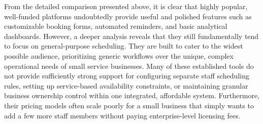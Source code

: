 \begin{table}[h]
\centering
\caption{Feature Comparison: Slotify vs. Existing Platforms} \label{tab:litreview}
\renewcommand{\arraystretch}{1.15}
\end{table}

From the detailed comparison presented above, it is clear that highly popular, well-funded platforms undoubtedly provide useful and polished features such as customizable booking forms, automated reminders, and basic analytical dashboards. However, a deeper analysis reveals that they still fundamentally tend to focus on general-purpose scheduling. They are built to cater to the widest possible audience, prioritizing generic workflows over the unique, complex operational needs of small service businesses. Many of these established tools do not provide sufficiently strong support for configuring separate staff scheduling rules, setting up service-based availability constraints, or maintaining granular business ownership control within one integrated, affordable system. Furthermore, their pricing models often scale poorly for a small business that simply wants to add a few more staff members without paying enterprise-level licensing fees.

